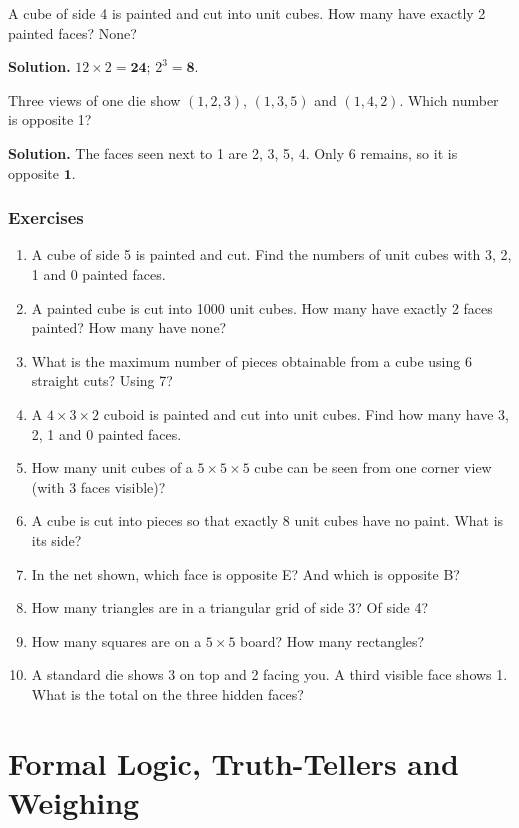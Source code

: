 \documentclass[11pt,a4paper,openany]{report}
\newenvironment{exercises}{\subsection*{Exercises \thechapter}\begin{enumerate}[label=\textbf{\thechapter.\arabic*},leftmargin=3.2em]}{\end{enumerate}}
\begin{document}
\begin{example}[painted]
A cube of side 4 is painted and cut into unit cubes. How many have exactly 2 painted faces? None?

\textbf{Solution.} $12\times2=\mathbf{24}$; $2^3=\mathbf{8}$.
\end{example}

\begin{example}[dice]
Three views of one die show $(1,2,3)$, $(1,3,5)$ and $(1,4,2)$. Which number is opposite 1?

\textbf{Solution.} The faces seen next to 1 are 2, 3, 5, 4. Only 6 remains, so it is opposite $\mathbf{1}$.
\end{example}

\begin{exercises}
\item A cube of side 5 is painted and cut. Find the numbers of unit cubes with 3, 2, 1 and 0 painted faces.
\item A painted cube is cut into 1000 unit cubes. How many have exactly 2 faces painted? How many have none?
\item What is the maximum number of pieces obtainable from a cube using 6 straight cuts? Using 7?
\item A $4\times3\times2$ cuboid is painted and cut into unit cubes. Find how many have 3, 2, 1 and 0 painted faces.
\item How many unit cubes of a $5\times5\times5$ cube can be seen from one corner view (with 3 faces visible)?
\item A cube is cut into pieces so that exactly 8 unit cubes have no paint. What is its side?
\item In the net shown, which face is opposite E? And which is opposite B?
\item How many triangles are in a triangular grid of side 3? Of side 4?
\item How many squares are on a $5\times5$ board? How many rectangles?
\item A standard die shows 3 on top and 2 facing you. A third visible face shows 1. What is the total on the three hidden faces?
\end{exercises}

\chapter{Formal Logic, Truth-Tellers and Weighing}\label{ch:logic}
\end{document}
